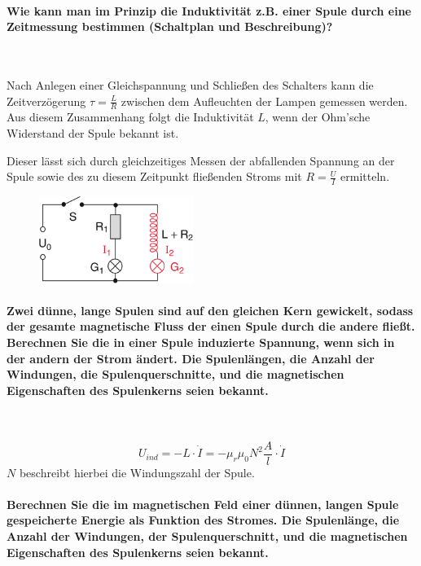 \documentclass[a4paper, 11pt, ngerman, parskip=half-]{scrartcl}
\begin{document}
\paragraph{Wie kann man im Prinzip die Induktivität z.B. einer Spule durch eine Zeitmessung
    bestimmen (Schaltplan und Beschreibung)?} ~

Nach Anlegen einer Gleichspannung und Schließen des Schalters kann die Zeitverzögerung
$\tau = \frac{L}{R}$ zwischen dem Aufleuchten der Lampen gemessen werden. Aus diesem Zusammenhang
folgt die Induktivität $L$, wenn der Ohm'sche Widerstand der Spule bekannt ist.

Dieser lässt sich durch gleichzeitiges Messen der abfallenden Spannung an der Spule sowie des zu
diesem Zeitpunkt fließenden Stroms mit $R = \frac{U}{I}$ ermitteln.

\begin{figure}[H]
    \centering
    \includegraphics[width=5cm]{image/07/10}
\end{figure}

\paragraph{Zwei dünne, lange Spulen sind auf den gleichen Kern gewickelt, sodass der gesamte
    magnetische Fluss der einen Spule durch die andere fließt. Berechnen Sie die in einer Spule
    induzierte Spannung, wenn sich in der andern der Strom ändert. Die Spulenlängen, die Anzahl der
    Windungen, die Spulenquerschnitte, und die magnetischen Eigenschaften des Spulenkerns seien
    bekannt.} ~

\begin{equation}
    U_{ind} = -L \cdot \dot{I}
    = - \mu_r \mu_0 N^2 \frac{A}{l} \cdot \dot{I}
\end{equation}
$N$ beschreibt hierbei die Windungszahl der Spule.

\paragraph{Berechnen Sie die im magnetischen Feld einer dünnen, langen Spule gespeicherte Energie
    als Funktion des Stromes. Die Spulenlänge, die Anzahl der Windungen, der Spulenquerschnitt, und die
    magnetischen Eigenschaften des Spulenkerns seien bekannt.}
\end{document}
